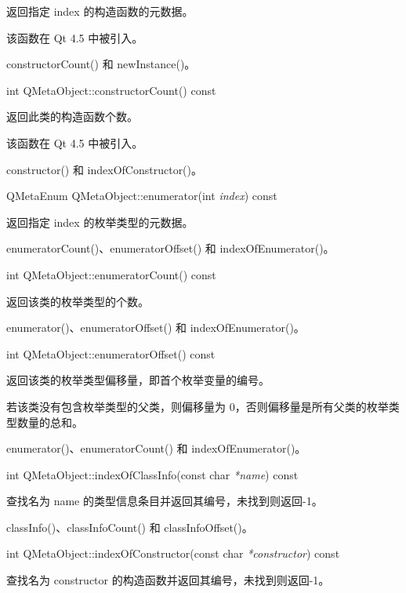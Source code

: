 返回指定 index 的构造函数的元数据。

该函数在 Qt 4.5 中被引入。

\begin{notice}[另请参阅]
constructorCount() 和 newInstance()。
\end{notice}

int QMetaObject::constructorCount() const

返回此类的构造函数个数。

该函数在 Qt 4.5 中被引入。

\begin{notice}[另请参阅]
constructor() 和 indexOfConstructor()。
\end{notice}

QMetaEnum QMetaObject::enumerator(int \emph{index}) const

返回指定 index 的枚举类型的元数据。

\begin{notice}[另请参阅]
enumeratorCount()、enumeratorOffset() 和 indexOfEnumerator()。
\end{notice}

int QMetaObject::enumeratorCount() const

返回该类的枚举类型的个数。

\begin{notice}[另请参阅]
enumerator()、enumeratorOffset() 和 indexOfEnumerator()。
\end{notice}
	
int QMetaObject::enumeratorOffset() const

返回该类的枚举类型偏移量，即首个枚举变量的编号。

若该类没有包含枚举类型的父类，则偏移量为 0，否则偏移量是所有父类的枚举类型数量的总和。

\begin{notice}[另请参阅]
enumerator()、enumeratorCount() 和 indexOfEnumerator()。
\end{notice}

int QMetaObject::indexOfClassInfo(const char \emph{*name}) const

查找名为 name 的类型信息条目并返回其编号，未找到则返回-1。

\begin{notice}[另请参阅]
classInfo()、classInfoCount() 和 classInfoOffset()。
\end{notice}

int QMetaObject::indexOfConstructor(const char \emph{*constructor}) const

查找名为 constructor 的构造函数并返回其编号，未找到则返回-1。

